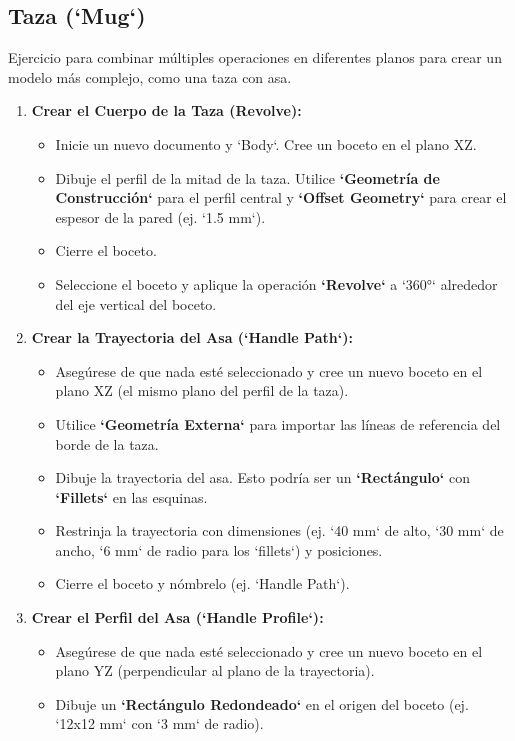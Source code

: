 \documentclass[12pt]{article}
\begin{document}
\subsection{Taza (`Mug`)}
Ejercicio para combinar múltiples operaciones en diferentes planos para crear un modelo más complejo, como una taza con asa.
\begin{enumerate}[label=\arabic*)]
    \item \textbf{Crear el Cuerpo de la Taza (Revolve):}
    \begin{itemize}[label=\textendash]
        \item Inicie un nuevo documento y `Body`. Cree un boceto en el plano XZ.
        \item Dibuje el perfil de la mitad de la taza. Utilice \textbf{`Geometría de Construcción`} para el perfil central y \textbf{`Offset Geometry`} para crear el espesor de la pared (ej. `1.5 mm`).
        \item Cierre el boceto.
        \item Seleccione el boceto y aplique la operación \textbf{`Revolve`} a `360°` alrededor del eje vertical del boceto.
    \end{itemize}
    \item \textbf{Crear la Trayectoria del Asa (`Handle Path`):}
    \begin{itemize}[label=\textendash]
        \item Asegúrese de que nada esté seleccionado y cree un nuevo boceto en el plano XZ (el mismo plano del perfil de la taza).
        \item Utilice \textbf{`Geometría Externa`} para importar las líneas de referencia del borde de la taza.
        \item Dibuje la trayectoria del asa. Esto podría ser un \textbf{`Rectángulo`} con \textbf{`Fillets`} en las esquinas.
        \item Restrinja la trayectoria con dimensiones (ej. `40 mm` de alto, `30 mm` de ancho, `6 mm` de radio para los `fillets`) y posiciones.
        \item Cierre el boceto y nómbrelo (ej. `Handle Path`).
    \end{itemize}
    \item \textbf{Crear el Perfil del Asa (`Handle Profile`):}
    \begin{itemize}[label=\textendash]
        \item Asegúrese de que nada esté seleccionado y cree un nuevo boceto en el plano YZ (perpendicular al plano de la trayectoria).
        \item Dibuje un \textbf{`Rectángulo Redondeado`} en el origen del boceto (ej. `12x12 mm` con `3 mm` de radio).

\end{itemize}
\end{enumerate}
\end{document}
